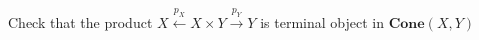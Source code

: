 
Check that the product $X \xleftarrow{p_X} X \times Y \xrightarrow{p_Y} Y$ is terminal object in $\mathbf{Cone}(X,Y)$